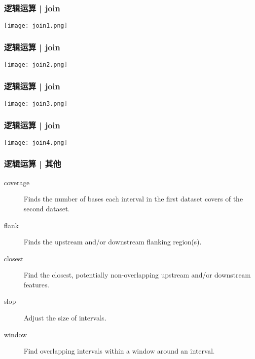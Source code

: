 \begin{frame}
  \frametitle{逻辑运算 | join}
    \begin{center}
      \texttt{[image: join1.png]}
    \end{center}
\end{frame}

\begin{frame}
  \frametitle{逻辑运算 | join}
    \begin{center}
      \texttt{[image: join2.png]}
    \end{center}
\end{frame}

\begin{frame}
  \frametitle{逻辑运算 | join}
    \begin{center}
      \texttt{[image: join3.png]}
    \end{center}
\end{frame}

\begin{frame}
  \frametitle{逻辑运算 | join}
    \begin{center}
      \texttt{[image: join4.png]}
    \end{center}
\end{frame}

\begin{frame}
  \frametitle{逻辑运算 | 其他}
  \begin{description}
    \item[coverage] Finds the number of bases each interval in the first dataset covers of the second dataset.
    \item[flank] Finds the upstream and/or downstream flanking region(s).
    \item[closest] Find the closest, potentially non-overlapping upstream and/or downstream features.
    \item[slop] Adjust the size of intervals.
    \item[window] Find overlapping intervals within a window around an interval.
  \end{description}
\end{frame}

